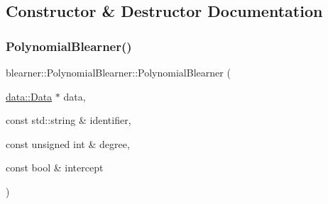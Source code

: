 \subsection{Constructor \& Destructor Documentation}
\mbox{\label{classblearner_1_1_polynomial_blearner_abc12720faabbad27d60d2dbdb006802e}} 
\subsubsection{\texorpdfstring{Polynomial\+Blearner()}{PolynomialBlearner()}}
{\footnotesize\ttfamily blearner\+::\+Polynomial\+Blearner\+::\+Polynomial\+Blearner (\begin{DoxyParamCaption}\item[{\mbox{\hyperlink{classdata_1_1_data}{data\+::\+Data}} $\ast$}]{data,  }\item[{const std\+::string \&}]{identifier,  }\item[{const unsigned int \&}]{degree,  }\item[{const bool \&}]{intercept }\end{DoxyParamCaption})}

